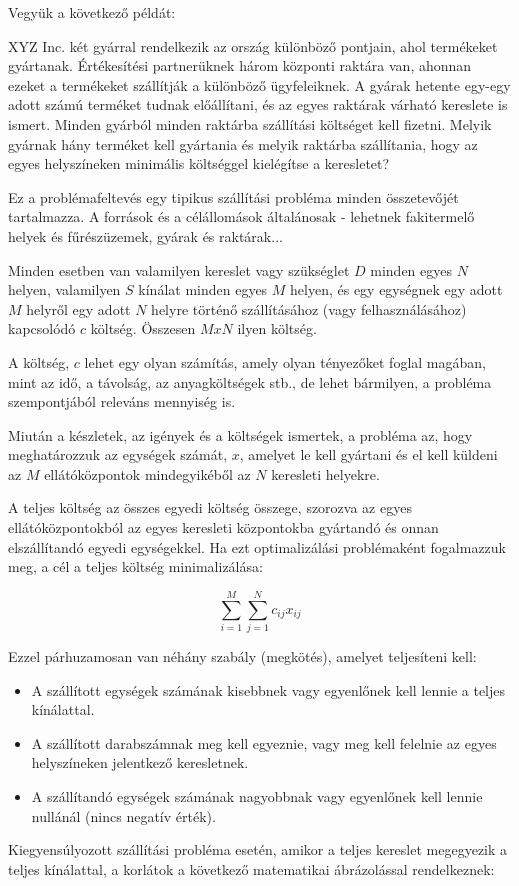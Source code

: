	Vegyük a következő példát:
	
	XYZ Inc. két gyárral rendelkezik az ország különböző pontjain, ahol termékeket gyártanak. Értékesítési partnerüknek három központi raktára van, ahonnan ezeket a termékeket szállítják a különböző ügyfeleiknek. A gyárak hetente egy-egy adott számú terméket tudnak előállítani, és az egyes raktárak várható kereslete is ismert. Minden gyárból minden raktárba szállítási költséget kell fizetni. Melyik gyárnak hány terméket kell gyártania és melyik raktárba szállítania, hogy az egyes helyszíneken minimális költséggel kielégítse a keresletet?
	
	Ez a problémafeltevés egy tipikus szállítási probléma minden összetevőjét tartalmazza. A források és a célállomások általánosak - lehetnek fakitermelő helyek és fűrészüzemek, gyárak és raktárak...
	
	Minden esetben van valamilyen kereslet vagy szükséglet $D$ minden egyes $N$ helyen, valamilyen $S$ kínálat minden egyes $M$ helyen, és egy egységnek egy adott $M$ helyről egy adott $N$ helyre történő szállításához (vagy felhasználásához) kapcsolódó $c$ költség. Összesen $M x N$ ilyen költség.
	
	A költség, $c$ lehet egy olyan számítás, amely olyan tényezőket foglal magában, mint az idő, a távolság, az anyagköltségek stb., de lehet bármilyen, a probléma szempontjából releváns mennyiség is.
	
	Miután a készletek, az igények és a költségek ismertek, a probléma az, hogy meghatározzuk az egységek számát, $x$, amelyet le kell gyártani és el kell küldeni az $M$ ellátóközpontok mindegyikéből az $N$ keresleti helyekre.
	
	A teljes költség az összes egyedi költség összege, szorozva az egyes ellátóközpontokból az egyes keresleti központokba gyártandó és onnan elszállítandó egyedi egységekkel. Ha ezt optimalizálási problémaként fogalmazzuk meg, a cél a teljes költség minimalizálása:
	
	$$\sum_{i=1}^M \sum_{j=1}^N c_{ij}x_{ij}$$

Ezzel párhuzamosan van néhány szabály (megkötés), amelyet teljesíteni kell:
	\begin{itemize}
\item{A szállított egységek számának kisebbnek vagy egyenlőnek kell lennie a teljes kínálattal.}
\item{A szállított darabszámnak meg kell egyeznie, vagy meg kell felelnie az egyes helyszíneken jelentkező keresletnek.}
\item{A szállítandó egységek számának nagyobbnak vagy egyenlőnek kell lennie nullánál (nincs negatív érték).}
\end{itemize}
Kiegyensúlyozott szállítási probléma esetén, amikor a teljes kereslet megegyezik a teljes kínálattal, a korlátok a következő matematikai ábrázolással rendelkeznek:

